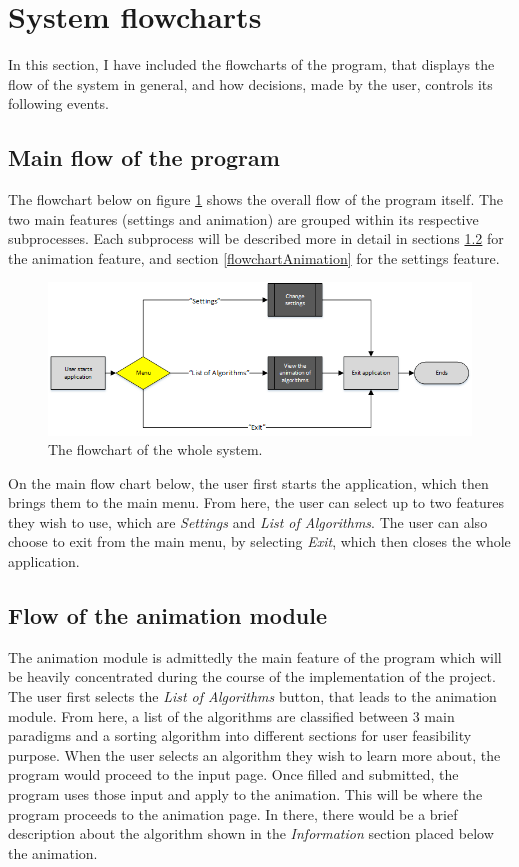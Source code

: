 \section{System flowcharts}
In this section, I have included the flowcharts of the program, that displays the flow of the system in general, and how decisions, made by the user, controls its following events. 

\subsection{Main flow of the program}
The flowchart below on figure \ref{mainFlowChart} shows the overall flow of the program itself. The two main features (settings and animation) are grouped within its respective subprocesses. Each subprocess will be described more in detail in sections \ref{sec:flowchartAnimation} for the animation feature, and section \ref{flowchartAnimation} for the settings feature.

\begin{figure}[H]
\centering
\hspace*{-1cm}
\includegraphics[scale=1]{images/report_images/flowchartMain.png}
\caption{The flowchart of the whole system.}
\label{mainFlowChart}
\end{figure}

On the main flow chart below, the user first starts the application, which then brings them to the main menu. From here, the user can select up to two features they wish to use, which are \textit{Settings} and \textit{List of Algorithms}. The user can also choose to exit from the main menu, by selecting \textit{Exit}, which then closes the whole application.

\subsection{Flow of the animation module} \label{sec:flowchartAnimation}
The animation module is admittedly the main feature of the program which will be heavily concentrated during the course of the implementation of the project. The user first selects the \textit{List of Algorithms} button, that leads to the animation module. From here, a list of the algorithms are classified between 3 main paradigms and a sorting algorithm into different sections for user feasibility purpose. When the user selects an algorithm they wish to learn more about, the program would proceed to the input page. Once filled and submitted, the program uses those input and apply to the animation. This will be where the program proceeds to the animation page. In there, there would be a brief description about the algorithm shown in the \textit{Information} section placed below the animation. 

